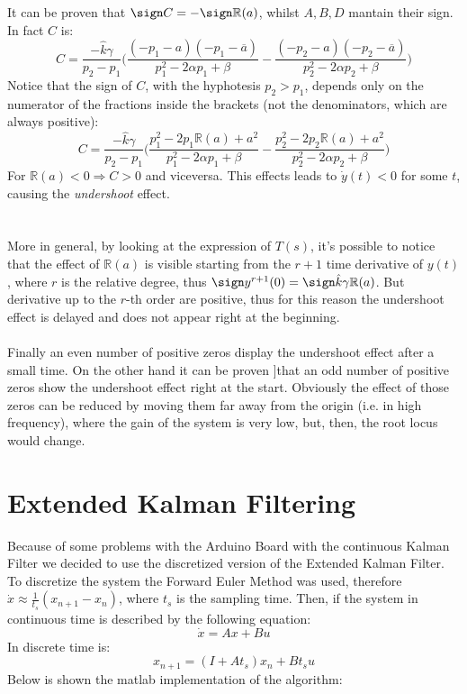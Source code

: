 It can be proven that $\sign C =  - \sign \mathbb{R}(a)$, whilst $A,B,D$ mantain their sign. In fact $C$ is:
$$C=\frac{-\hat{k}\gamma}{p_2-p_1} \Big( \frac{(-p_1-a)(-p_1-\overline{a})}{p_1^2-2\alpha p_1+\beta} -\frac{(-p_2-a)(-p_2-\overline{a})}{p_2^2-2\alpha p_2+\beta} \Big) $$
Notice that the sign of $C$, with the hyphotesis $p_2 > p_1$, depends only on the numerator of the fractions inside the brackets (not the denominators, which are always positive):
$$C=\frac{-\hat{k}\gamma}{p_2-p_1}\Big ( \frac{p_1^2 -2p_1 \mathbb{R}(a) +a^2}{p_1^2-2\alpha p_1+\beta} -\frac{p_2^2 -2p_2 \mathbb{R}(a) +a^2}{p_2^2-2\alpha p_2+\beta} \Big)$$
For $\mathbb{R}(a) < 0 \Rightarrow C > 0$ and viceversa. This effects leads to $\dot{y}(t) <0$ for some $t$, causing the \emph{undershoot} effect.  \\ \\ \\
More in general, by looking at the expression of $T(s)$, it's possible to notice that the effect of $\mathbb{R}(a)$ is visible starting from the $r+1$ time derivative of $y(t)$, where $r$ is the relative degree, thus $\sign y^{r+1}(0)  = \sign \hat{k}\gamma \mathbb{R}(a)$. But derivative up to the $r$-th order are positive, thus for this reason the undershoot effect is delayed and does not appear right at the beginning. \\ \\
Finally an even number of positive zeros display the undershoot effect  after a small time. On the other hand it can be proven  \cite{hoagg2006}]that an odd number of positive zeros show the undershoot effect right at the start. Obviously the effect of those zeros can be reduced by moving them far away from the origin (i.e. in high frequency), where the gain of the system is very low,  but, then, the root locus would change. \\

\section{Extended Kalman Filtering}
Because of some problems with the Arduino Board with the continuous Kalman Filter we decided to use the discretized version of the Extended Kalman Filter.  To discretize the system the Forward Euler Method was used, therefore $\dot{x} \approx \frac{1}{t_s}(x_{n+1}-x_{n})$, where $t_s$ is the sampling time. Then, if the system in continuous time is described by the following equation:
\begin{equation}
\dot{x}=Ax+Bu
\end{equation}
In discrete time is:
\begin{equation}
x_{n+1}=(I+At_s)x_n + B t_s u
\end{equation}
Below is shown the matlab implementation of the algorithm:

